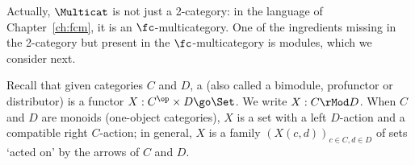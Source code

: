 Actually, $\Multicat$ is not just a 2-category: in the language of
Chapter~\ref{ch:fcm}, it is an $\fc$-multicategory.  One of the ingredients
missing in the 2-category but present in the $\fc$-multicategory is
modules, which we consider next.




Recall that given categories $C$ and $D$, a %
% 
%
%
% 
(also called a bimodule, profunctor or distributor) is a functor $X: C^\op
\times D \go \Set$.  We write $X: C \rMod D$.  When $C$ and $D$ are monoids
(one-object categories), $X$ is a set with a left $D$-action and a
compatible right $C$-action; in general, $X$ is a family $(X(c,d))_{c\in C,
d\in D}$ of sets `acted on' by the arrows of $C$ and $D$.

